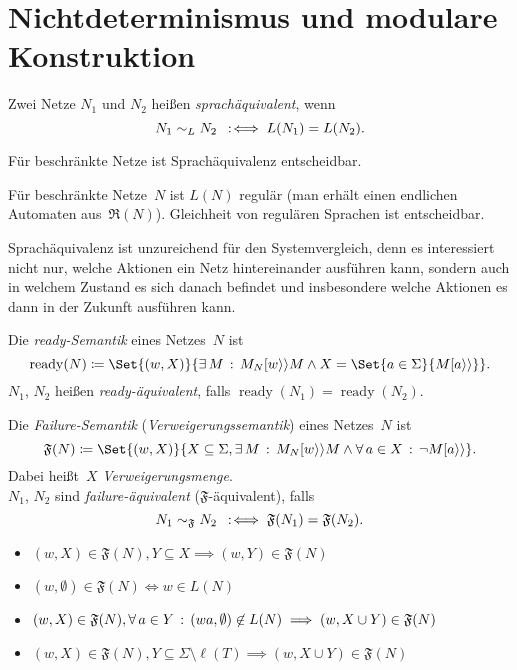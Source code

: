 \documentclass{cheat-sheet}
\newcommand{\labelledTransition}[1]{[{#1}\rangle\rangle} %
\newcommand{\ReachabilityGraph}{\mathfrak{R}} %
\DeclareMathOperator{\ready}{ready} %
\newcommand{\Failure}{\mathfrak{F}} %
\begin{document}
\section{Nichtdeterminismus und modulare Konstruktion}

\begin{defn}
  Zwei Netze $N_1$ und $N_2$ heißen \emph{sprachäquivalent}, wenn
  \[
    N_1 \sim_L N_2 \enspace:\!\iff L(N_1) = L(N_2).
  \]
\end{defn}

\begin{satz}
  Für beschränkte Netze ist Sprachäquivalenz entscheidbar.
\end{satz}

\begin{beweis}
  Für beschränkte Netze~$N$ ist $L(N)$ regulär (man erhält einen endlichen Automaten aus~$\ReachabilityGraph(N)$).
  Gleichheit von regulären Sprachen ist entscheidbar.
\end{beweis}

\begin{bem}
  Sprachäquivalenz ist unzureichend für den Systemvergleich, denn es interessiert nicht nur, welche Aktionen ein Netz hintereinander ausführen kann, sondern auch in welchem Zustand es sich danach befindet und insbesondere welche Aktionen es dann in der Zukunft ausführen kann.
\end{bem}

\begin{defn}
  Die \emph{ready-Semantik} eines Netzes~$N$ ist
  \[
    \ready(N) \coloneqq \Set{(w, X)}{\ex{M} M_N \labelledTransition{w} M \wedge X = \Set{a \in \Sigma}{M \labelledTransition{a}}}.
  \]
  $N_1$, $N_2$ heißen \emph{ready-äquivalent}, falls $\ready(N_1) = \ready(N_2)$.
\end{defn}

\begin{defn}
  Die \emph{Failure-Semantik} (\textit{Verweigerungssemantik}) eines Netzes~$N$ ist
  \[
    \Failure(N) \coloneqq \Set{(w, X)}{X \subseteq \Sigma, \ex{M} M_N \labelledTransition{w} M \wedge \fa{a \in X} \neg M \labelledTransition{a}}.
  \]
  Dabei heißt~$X$ \textit{Verweigerungsmenge}. \\
  $N_1$, $N_2$ sind \emph{failure-äquivalent} ($\Failure$-äquivalent), falls
  \[
    N_1 \sim_\Failure N_2 \coloniff \Failure(N_1) = \Failure(N_2).
  \]
\end{defn}

\begin{lem}
  \begin{itemize}
    \item $(w, X) \in \Failure(N), Y \subseteq X \implies (w, Y) \in \Failure(N)$
    \item $(w, \emptyset) \in \Failure(N) \iff w \in L(N)$
    \item $(w, X) \in \Failure(N), \fa{a \in Y} (wa, \emptyset) \not\in L(N) \implies (w, X \cup Y) \in \Failure(N)$
    \item $(w, X) \in \Failure(N), Y \subseteq \Sigma \setminus \ell(T) \implies (w, X \cup Y) \in \Failure(N)$
  \end{itemize}
\end{lem}
\end{document}
